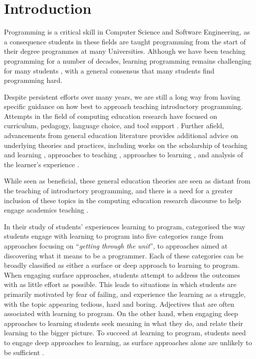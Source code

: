\chapter{Introduction} %
\label{cha:introduction}

Programming is a critical skill in Computer Science and Software Engineering, as a consequence students in these fields are taught programming from the start of their degree programmes at many Universities. Although we have been teaching programming for a number of decades, learning programming remains challenging for many students \cite{Jenkins:2002,Lister:2004,McCracken:2001,Ragonis:2007,Robins:2003,Rountree:2002,Renumol:2010,Wiedenbeck:2005}, with a general consensus that many students find programming hard. 

Despite persistent efforts over many years, we are still a long way from having specific guidance on how best to approach teaching introductory programming. Attempts in the field of computing education research have focused on curriculum, pedagogy, language choice, and tool support \cite{Pears:2007}. Further afield, advancements from general education literature provides additional advice on underlying theories and practices, including works on the scholarship of teaching and learning \cite{Boyer:1990}, approaches to teaching \cite{Martin:2000}, approaches to learning \cite{Marton:1976a,Trigwell:1999}, and analysis of the learner's experience \cite{Marton:1997}. 

While seen as beneficial, these general education theories are seen as distant from the teaching of introductory programming, and there is a need for a greater inclusion of these topics in the computing education research discourse to help engage academics teaching \IP.

In their study of students' experiences learning to program, \citet{Bruce:2003} categorised the way students engage with learning to program into five categories range from approaches focusing on ``\emph{getting through the unit}'', to approaches aimed at discovering what it means to be a programmer. Each of these categories can be broadly classified as either a surface or deep approach \cite{Marton:1976a,Ramsden:1992} to learning to program. When engaging surface approaches, students attempt to address the outcomes with as little effort as possible. This leads to situations in which students are primarily motivated by fear of failing, and experience the learning as a struggle, with the topic appearing tedious, hard and boring. Adjectives that are often associated with learning to program. On the other hand, when engaging deep approaches to learning students seek meaning in what they do, and relate their learning to the bigger picture. To succeed at learning to program, students need to engage deep approaches to learning, as surface approaches alone are unlikely to be sufficient \cite{Bruce:2003}.


